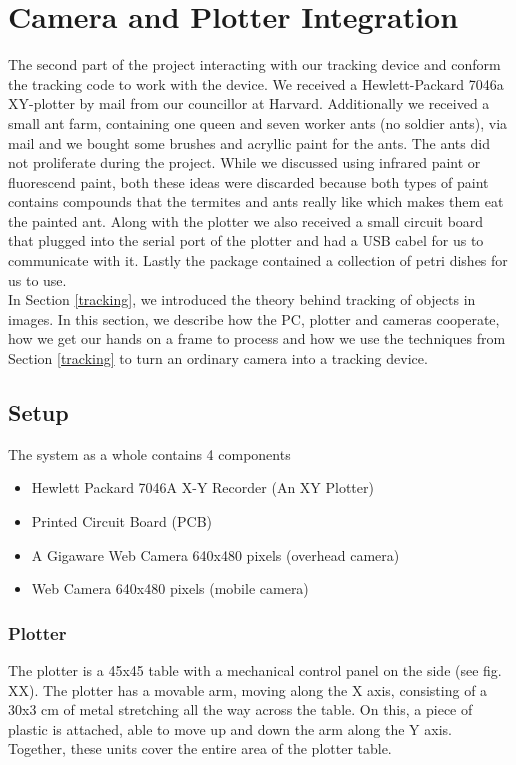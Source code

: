 
\section{Camera and Plotter Integration}
The second part of the project interacting with our tracking device and conform the tracking code to work with the device. We received a Hewlett-Packard 7046a XY-plotter by mail from our councillor at Harvard. Additionally we received a small ant farm, containing one queen and seven worker ants (no soldier ants), via mail and we bought some brushes and acryllic paint for the ants. The ants did not proliferate during the project. While we discussed using infrared paint or fluorescend paint, both these ideas were discarded because both types of paint contains compounds that the termites and ants really like which makes them eat the painted ant. Along with the plotter we also received a small circuit board that plugged into the serial port of the plotter and had a USB cabel for us to communicate with it. Lastly the package contained a collection of petri dishes for us to use. \\

In Section \ref{tracking}, we introduced the theory behind tracking of objects in images. In this section, we describe how the PC, plotter and cameras cooperate, how we get our hands on a frame to process and how we use the techniques from Section \ref{tracking} to turn an ordinary camera into a tracking device.

\subsection{Setup}

The system as a whole contains 4 components

\begin{itemize}
  \item Hewlett Packard 7046A X-Y Recorder (An XY Plotter)
  \item Printed Circuit Board (PCB)
  \item A Gigaware Web Camera 640x480 pixels (overhead camera)
  \item Web Camera 640x480 pixels (mobile camera)
\end{itemize}

\subsubsection{Plotter}
The plotter is a 45x45 table with a mechanical control panel on the side (see fig. XX). The plotter has a movable arm, moving along the X axis, consisting of a 30x3 cm of metal stretching all the way across the table. On this, a piece of plastic is attached, able to move up and down the arm along the Y axis. Together, these units cover the entire area of the plotter table. \\

